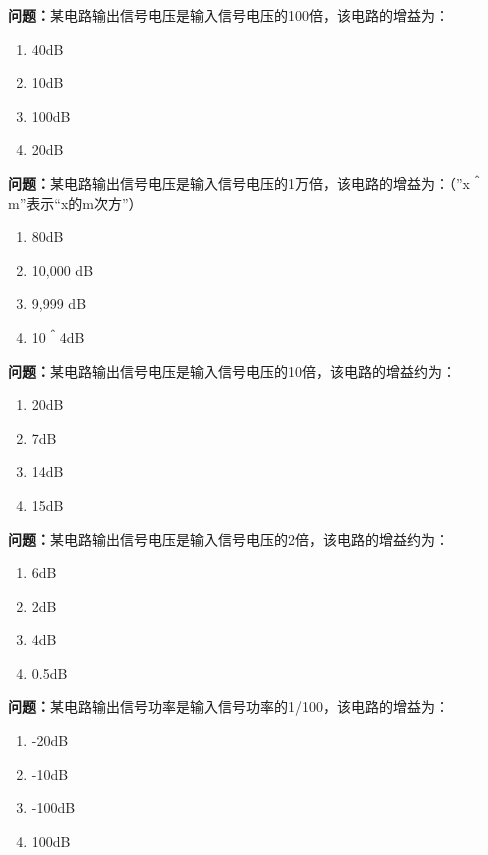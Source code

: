 \bigskip


\noindent\textbf{问题：}某电路输出信号电压是输入信号电压的100倍，该电路的增益为：
\begin{enumerate}[label=\Alph*), leftmargin=3em]
\item 40dB
\item 10dB
\item 100dB
\item 20dB
\end{enumerate}

\bigskip


\noindent\textbf{问题：}某电路输出信号电压是输入信号电压的1万倍，该电路的增益为：（”x＾m”表示“x的m次方”）
\begin{enumerate}[label=\Alph*), leftmargin=3em]
\item 80dB
\item 10,000 dB
\item 9,999 dB
\item 10＾4dB
\end{enumerate}

\bigskip


\noindent\textbf{问题：}某电路输出信号电压是输入信号电压的10倍，该电路的增益约为：
\begin{enumerate}[label=\Alph*), leftmargin=3em]
\item 20dB
\item 7dB
\item 14dB
\item 15dB
\end{enumerate}

\bigskip


\noindent\textbf{问题：}某电路输出信号电压是输入信号电压的2倍，该电路的增益约为：
\begin{enumerate}[label=\Alph*), leftmargin=3em]
\item 6dB
\item 2dB
\item 4dB
\item 0.5dB
\end{enumerate}

\bigskip


\noindent\textbf{问题：}某电路输出信号功率是输入信号功率的1/100，该电路的增益为：
\begin{enumerate}[label=\Alph*), leftmargin=3em]
\item -20dB
\item -10dB
\item -100dB
\item 100dB
\end{enumerate}

